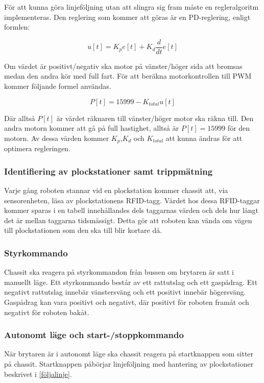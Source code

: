 För att kunna göra linjeföljning utan att slingra sig fram måste en regleralgoritm implementeras. Den reglering som kommer att göras är en PD-reglering, enligt formlen:

$$u[t] = K_{p}e[t] + K_{d}\frac{d}{dt}e[t]$$

Om värdet är positivt/negativ ska motor på vänster/höger sida att bromsas medan den andra kör med full fart. För att beräkna motorkontrollen till PWM kommer följande formel användas.

$$P[t] = 15999 - K_{total}u[t]$$

Där alltså $P[t]$ är värdet räknaren till vänster/höger motor ska räkna till. Den andra motorn kommer att gå på full hastighet, alltså är $P[t] = 15999$ för den motorn. Av dessa värden kommer $K_{p}$,$K_{d}$ och $K_{total}$ att kunna ändras för att optimera regleringen.


\subsubsection{Identifiering av plockstationer samt trippmätning}

Varje gång roboten stannar vid en plockstation kommer chassit att, via sensorenheten, läsa av plockstationens RFID-tagg. Värdet hos dessa RFID-taggar kommer sparas i en tabell innehållandes dels taggarnas värden och dels hur långt det är mellan taggarna tidsmässigt. Detta gör att roboten kan vända om vägen till plockstationen som den ska till blir kortare då.


\subsubsection{Styrkommando}

Chassit ska reagera på styrkommandon från bussen om brytaren är satt i manuellt läge. Ett styrkommando består av ett rattutslag och ett gaspådrag. Ett negativt rattutslag innebär vänstersväng och ett positivt innebär högersväng. Gaspådrag kan vara positivt och negativt, där positivt för roboten framåt och negativt för roboten bakåt. 


\subsubsection{Autonomt läge och start-/stoppkommando}

När brytaren är i autonomt läge ska chassit reagera på startknappen som sitter på chassit. Startknappen påbörjar linjeföljning med hantering av plockstationer beskrivet i \ref{följalinje}.


